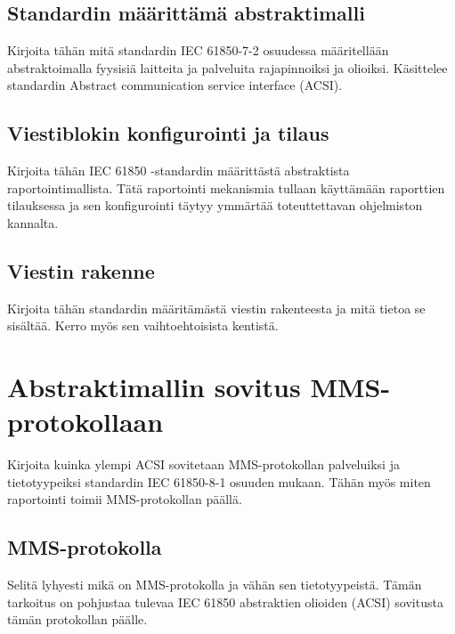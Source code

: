 \subsection{Standardin määrittämä abstraktimalli}
\begin{it}
	Kirjoita tähän mitä standardin IEC 61850-7-2 osuudessa määritellään abstraktoimalla fyysisiä laitteita ja palveluita rajapinnoiksi ja olioiksi. Käsittelee standardin Abstract communication service interface (ACSI).
\end{it}

\subsection{Viestiblokin konfigurointi ja tilaus}
\begin{it}
	Kirjoita tähän IEC 61850 -standardin määrittästä abstraktista raportointimallista. Tätä raportointi mekanismia tullaan käyttämään raporttien tilauksessa ja sen konfigurointi täytyy ymmärtää toteuttettavan ohjelmiston kannalta.
\end{it}

\subsection{Viestin rakenne}
\begin{it}
	Kirjoita tähän standardin määritämästä viestin rakenteesta ja mitä tietoa se sisältää. Kerro myös sen vaihtoehtoisista kentistä.
\end{it}

\section{Abstraktimallin sovitus MMS-protokollaan}
\begin{it}
	Kirjoita kuinka ylempi ACSI sovitetaan MMS-protokollan palveluiksi ja tietotyypeiksi standardin IEC 61850-8-1 osuuden mukaan. Tähän myös miten raportointi toimii MMS-protokollan päällä.
\end{it}

\subsection{MMS-protokolla}
\begin{it}
	Selitä lyhyesti mikä on MMS-protokolla ja vähän sen tietotyypeistä. Tämän tarkoitus on pohjustaa tulevaa IEC 61850 abstraktien olioiden (ACSI) sovitusta tämän protokollan päälle.
\end{it}

